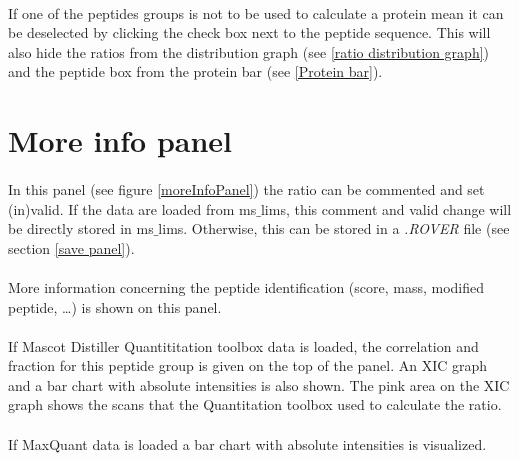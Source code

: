 \documentclass[11pt,a4paper,oneside,notitlepage]{book}
\begin{document}
\paragraph{}If one of the peptides groups is not to be used to calculate a protein mean it can be deselected by clicking the check box next to the peptide sequence. This will also hide the ratios from the distribution graph (see \ref{ratio distribution graph}) and the peptide box from the protein bar (see \ref{Protein bar}).


\section{More info panel} \label{moreInfo}

\paragraph{}In this panel (see figure \ref{moreInfoPanel}) the ratio can be commented and set (in)valid. If the data are loaded from ms$\_$lims, this comment and valid change will be directly stored in ms$\_$lims. Otherwise, this can be stored in a \textit{.ROVER} file (see section \ref{save panel}). 

\paragraph{}More information concerning the peptide identification (score, mass, modified peptide, \ldots) is shown on this panel.

\paragraph{}If Mascot Distiller Quantititation toolbox data is loaded, the correlation and fraction for this peptide group is given on the top of the panel. An XIC graph and a bar chart with absolute intensities is also shown. The pink area on the XIC graph shows the scans that the Quantitation toolbox used to calculate the ratio.

\paragraph{}If MaxQuant data is loaded a bar chart with absolute intensities is visualized. 
\end{document}
